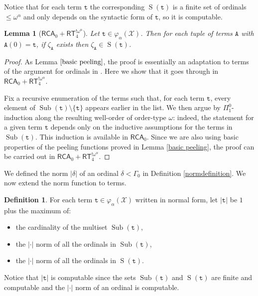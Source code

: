 \documentclass[11pt]{amsart}
\newtheorem{lemma}[thm]{Lemma}
\theoremstyle{definition}
\newtheorem{definition}[thm]{Definition}
\theoremstyle{remark}
\theoremstyle{plain}
\newcommand{\Sub}{\operatorname{Sub}}
\renewcommand{\S}{\operatorname{S}}
\def\X{\mathcal{X}}
\def\om{\omega}
\def\a{\alpha}
\def\G{\Gamma}
\def\d{\delta}
\def\z{\zeta}
\newcommand{\RCA}{\mathsf{RCA}_0}
\newcommand{\RT}{\mathsf{RT}}
\begin{document}
Notice that for each term $\mathtt{t}$ the corresponding $\S(\mathtt{t})$ is a finite set of ordinals $\le \om^\a$ and only depends on the syntactic form of $\mathtt{t}$, so it is computable.

\begin{lemma}[$\RCA + \RT^{! \om^\a}_4$]\label{lemma: Stau}
Let $\mathtt{t} \in \varphi_\a (\X)$.
Then for each tuple of terms $\mathtt{A}$ with $\mathtt{A}(0) = \mathtt{t}$, if $\z_\mathtt{A}$ exists then $\z_\mathtt{A} \in \S(\mathtt{t})$.
\end{lemma}

\begin{proof}
As Lemma $\ref{basic peeling}$, the proof is essentially an adaptation to terms of the argument for ordinals in \cite[Lemma 6.8]{marcone2025}.
Here we show that it goes through in $\RCA + \RT^{! \om^\a}_4$.

Fix a recursive enumeration of the terms such that, for each term $\mathtt{t}$, every element of $\Sub(\mathtt{t}) \setminus \{\mathtt{t}\}$ appears earlier in the list.  
We then argue by $\Pi^0_1$-induction along the resulting well-order of order-type $\omega$: indeed, the statement for a given term $\mathtt{t}$ depends only on the inductive assumptions for the terms in $\Sub(\mathtt{t})$.
This induction is available in $\RCA$.
Since we are also using basic properties of the peeling functions proved in Lemma \ref{basic peeling}, the proof can be carried out in $\RCA + \RT^{! \om^\a}_4$.
\end{proof}

We defined the norm $|\d|$ of an ordinal $\d < \G_0$ in Definition \ref{normdefinition}. 
We now extend the norm function to terms.

\begin{definition}\label{doublenorm}
For each term $\mathtt{t} \in \varphi_\a(\X)$ written in normal form, let $|\mathtt{t}|$ be $1$ plus the maximum of:
\begin{itemize}
    \item the cardinality of the multiset $\Sub (\mathtt{t})$,
	\item the $|\cdot|$ norm of all the ordinals in $\Sub (\mathtt{t})$,
	\item the $|\cdot|$ norm of all the ordinals in $\S(\mathtt{t})$.
\end{itemize}
\end{definition}

Notice that $|\mathtt{t}|$ is computable since the sets $\Sub (\mathtt{t})$ and $\S (\mathtt{t})$ are finite and computable and the $|\cdot|$ norm of an ordinal is computable.
\end{document}

